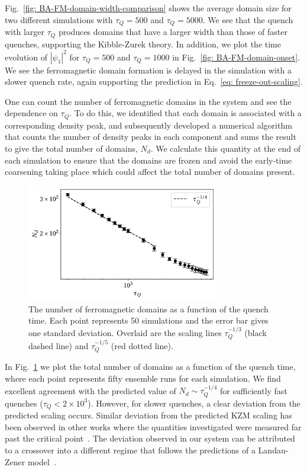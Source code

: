 Fig.~\ref{fig: BA-FM-domain-width-comparison} shows the average domain size
for two different simulations with \(\tau_Q=500\) and \(\tau_Q=5000\).
We see that the quench with larger \(\tau_Q\) produces domains that have a
larger width than those of faster quenches, supporting the Kibble-Zurek theory.
In addition, we plot the time evolution of \(|\psi_1|^2\) for \(\tau_Q=500\)
and \(\tau_Q=1000\) in Fig.~\ref{fig: BA-FM-domain-onset}.
We see the ferromagnetic domain formation is delayed in the simulation
with a slower quench rate, again supporting the prediction in
Eq.~\eqref{eq: freeze-out-scaling}.

One can count the number of ferromagnetic domains in the system and see the
dependence on \( \tau_Q \).
To do this, we identified that each domain is associated with a corresponding
density peak, and subsequently developed a numerical algorithm that counts the
number of density peaks in each component and sums the result to give the total
number of domains, \(N_d\).
We calculate this quantity at the end of each simulation to ensure that the
domains are frozen and avoid the early-time coarsening taking place which could
affect the total number of domains present.
\begin{figure}[htb!]
    \centering
    \includegraphics[width=0.75\textwidth]{gfx/ch-spin1/FM_domains_scaling.pdf}
    \caption[Total ferromagnetic domains in the system versus the quench rate
        \(\tau_Q\)]
    {The number of ferromagnetic domains as a function of the
        quench time. Each point represents 50 simulations and the
        error bar gives one standard deviation. Overlaid are the scaling lines
        \(\tau_Q^{-1/3}\) (black dashed line) and \(\tau_Q^{-1/5}\)
        (red dotted line).\label{fig: FM-domains-scaling}}
\end{figure}
In Fig.~\ref{fig: FM-domains-scaling} we plot the total number of domains
as a function of the quench time, where each point represents fifty ensemble
runs for each simulation.
We find excellent agreement with the predicted value of
\(N_d \sim \tau_Q^{-1/4}\) for sufficiently fast quenches (\(\tau_Q < 2
\times 10^3\)).
However, for slower quenches, a clear deviation from the predicted scaling
occurs.
Similar deviation from the predicted KZM scaling has been observed in other
works where the quantities investigated were measured far past the critical
point~\cite{Su2013, Swislocki2013}.
The deviation observed in our system can be attributed to a crossover into a
different regime that follows the predictions of a Landau-Zener
model~\cite{Zurek2005,Damski2005, Pellegrini2008,Divakaran2008}.

